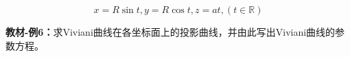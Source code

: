 \begin{center}
\end{center}

$$x=R\sin t, y=R\cos t, z=at,(t\in\mathbb{R})$$

{\bf 教材-例6：}求Viviani曲线在各坐标面上的投影曲线，并由此写出Viviani曲线的参数方程。

\begin{center}
\end{center}

